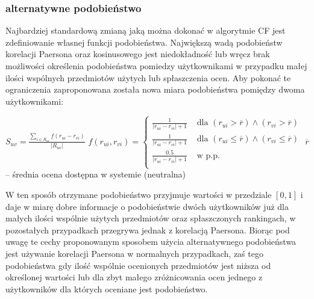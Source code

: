 \documentclass{pracamgr}
\begin{document}
    \subsubsection{alternatywne podobieństwo}
     Najbardziej standardową zmianą jaką można dokonać w algorytmie CF jest zdefiniowanie własnej funkcji podobieństwa.\newline
     Największą wadą podobieństw korelacji Paersona oraz kosinusowego jest niedokładność lub wręcz brak możliwości określenia podobieństwa pomiedzy użytkownikami
     w przypadku małej ilości wspólnych przedmiotów użytych lub spłaszczenia ocen.
     Aby pokonać te ograniczenia zaproponowana została nowa miara podobieństwa pomiędzy dwoma użytkownikami:\newline
     \begin{center}
      $S_{uv}=\frac{\sum\limits_{i\in R_{uv}}f(r_{ui}-r_{vi})}{|R_{uv}|}$\newline
      $f(r_{ui},r_{vi})=\left\{\begin{array}{cc}
                                 \frac{1}{|r_{ui}-r_{vi}|+1}& \text{ dla } (r_{ui}>\overline{r})\wedge(r_{vi}>\overline{r})\\
                                 \frac{1}{|r_{ui}-r_{vi}|+1}& \text{ dla } (r_{ui}\le\overline{r})\wedge(r_{vi}\le\overline{r})\\
                                 \frac{0.5}{|r_{ui}-r_{vi}|+1}& \text{ w p.p.}\\
                                \end{array}\right.$\newline
     {\scriptsize
     $\overline{r}$ -- średnia ocena dostępna w systemie (neutralna)
     }\newline    
     \end{center}
     W ten sposób otrzymane podobieństwo przyjmuje wartości w przedziale $[0,1]$ i daje w miarę dobre informacje o podobieństwie dwóch użytkowników
     już dla małych ilości wspólnie użytych przedmiotów oraz spłaszczonych rankingach,
     w pozostałych przypadkach przegrywa jednak z korelacją Paersona.\newline
     Biorąc pod uwagę te cechy proponowanym sposobem użycia alternatywnego podobieństwa jest używanie korelacji Paersona w normalnych przypadkach,
     zaś tego podobieństwa gdy ilość wspólnie ocenionych przedmiotów jest niższa od określonej wartości lub dla zbyt małego zróżnicowania ocen
     jednego z użytkowników dla których oceniane jest podobieństwo.
\end{document}
